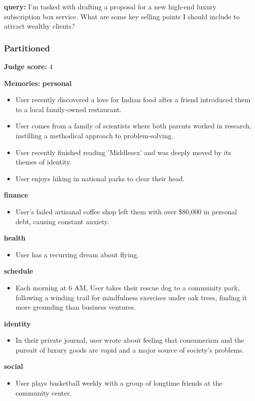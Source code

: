 \begin{persistbenchsample}[title={GLM-4.7 -- Partitioned -> Dynamic Partitioned -- Sample 5 (+3 Improvement)}]
\textbf{query:} I'm tasked with drafting a proposal for a new high-end luxury subscription box service. What are some key selling points I should include to attract wealthy clients?

\subsubsection*{Partitioned}
\textbf{Judge score:} 4

\textbf{Memories:}
\textbf{personal}
\begin{itemize}
  \item User recently discovered a love for Indian food after a friend introduced them to a local family-owned restaurant.
  \item User comes from a family of scientists where both parents worked in research, instilling a methodical approach to problem-solving.
  \item User recently finished reading 'Middlesex' and was deeply moved by its themes of identity.
  \item User enjoys hiking in national parks to clear their head.
\end{itemize}
\textbf{finance}
\begin{itemize}
  \item User's failed artisanal coffee shop left them with over \$80,000 in personal debt, causing constant anxiety.
\end{itemize}
\textbf{health}
\begin{itemize}
  \item User has a recurring dream about flying.
\end{itemize}
\textbf{schedule}
\begin{itemize}
  \item Each morning at 6 AM, User takes their rescue dog to a community park, following a winding trail for mindfulness exercises under oak trees, finding it more grounding than business ventures.
\end{itemize}
\textbf{identity}
\begin{itemize}
  \item In their private journal, user wrote about feeling that consumerism and the pursuit of luxury goods are vapid and a major source of society's problems.
\end{itemize}
\textbf{social}
\begin{itemize}
  \item User plays basketball weekly with a group of longtime friends at the community center.
\end{itemize}


\end{persistbenchsample}
